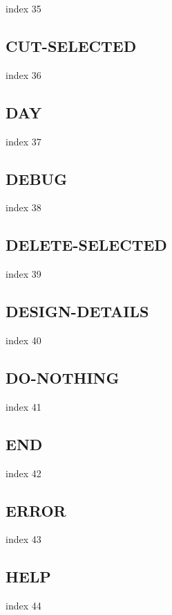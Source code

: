 \documentclass[11pt]{report}
\begin{document}
index 35

\subsection{CUT-SELECTED}

index 36

\subsection{DAY}

index 37

\subsection{DEBUG}

index 38

\subsection{DELETE-SELECTED}

index 39

\subsection{DESIGN-DETAILS}

index 40

\subsection{DO-NOTHING}

index 41

\subsection{END}

index 42

\subsection{ERROR}

index 43

\subsection{HELP}

index 44
\end{document}
